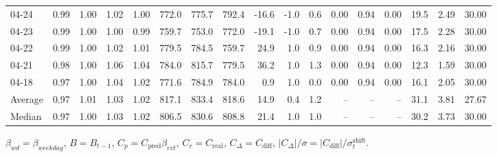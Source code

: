 \begin{threeparttable}
{\begin{tabular}{lrrrrrrrrrrrrrrrr}
  04-24 &         0.99 &           1.00 &          1.02 &          1.00 & 772.0 & 775.7 & 792.4 &      -16.6 &                     -1.0 &                 0.6 &       0.00 &      0.94 &           0.00 &             19.5 &            2.49 &                  30.00 \\
  04-23 &         0.99 &           1.00 &          1.00 &          0.99 & 759.7 & 753.0 & 772.0 &      -19.1 &                     -1.0 &                 0.7 &       0.00 &      0.94 &           0.00 &             17.5 &            2.28 &                  30.00 \\
  04-22 &         0.99 &           1.00 &          1.02 &          1.01 & 779.5 & 784.5 & 759.7 &       24.9 &                      1.0 &                 0.9 &       0.00 &      0.94 &           0.00 &             16.3 &            2.16 &                  30.00 \\
  04-21 &         0.98 &           1.00 &          1.06 &          1.04 & 784.0 & 815.7 & 779.5 &       36.2 &                      1.0 &                 1.3 &       0.00 &      0.94 &           0.00 &             12.3 &            1.59 &                  30.00 \\
  04-18 &         0.97 &           1.00 &          1.04 &          1.02 & 771.6 & 784.9 & 784.0 &        0.9 &                      1.0 &                 0.0 &       0.00 &      0.94 &           0.00 &             16.1 &            2.05 &                  30.00 \\
Average &         0.97 &           1.01 &          1.03 &          1.02 & 817.1 & 833.4 & 818.6 &       14.9 &                      0.4 &                 1.2 &         -- &        -- &             -- &             31.1 &            3.81 &                  27.67 \\
 Median &         0.97 &           1.00 &          1.03 &          1.02 & 806.5 & 830.6 & 808.8 &       21.4 &                      1.0 &                 1.0 &         -- &        -- &             -- &             30.2 &            3.73 &                  30.00 \\
\bottomrule
\end{tabular}
}
\begin{tablenotes}\footnotesize
\item $\beta_{wd}=\beta_{weekday}$, $B=B_{t-1}$,
$C_p=C_{\text{pred}}\beta_{evt}$, $C_r=C_{\text{real}}$,
$C_\Delta=C_{\text{diff}}$, $|C_\Delta|/\sigma=|C_{\text{diff}}|/\sigma_t^{\text{shift}}$.
\end{tablenotes}
\end{threeparttable}
\endgroup
